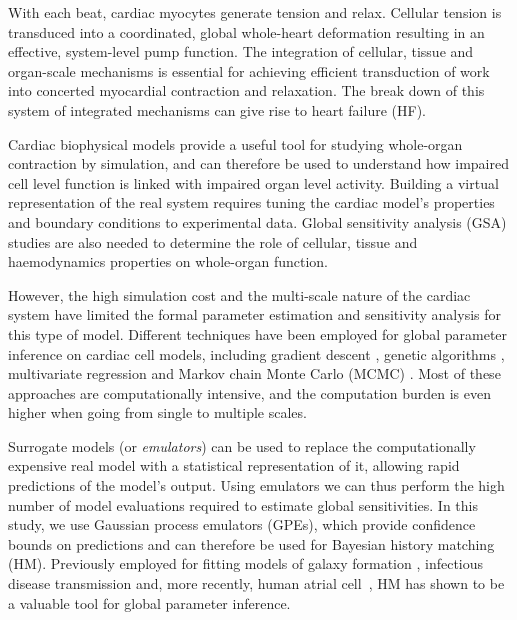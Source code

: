 
\noindent
With each beat, cardiac myocytes generate tension and relax. Cellular tension is transduced into a coordinated, global whole-heart deformation resulting in an effective, system-level pump function. The integration of cellular, tissue and organ-scale mechanisms is essential for achieving efficient transduction of work into concerted myocardial contraction and relaxation. The break down of this system of integrated mechanisms can give rise to heart failure (HF). 

Cardiac biophysical models provide a useful tool for studying whole-organ contraction \cite{Niederer:2019} by simulation, and can therefore be used to understand how impaired cell level function is linked with impaired organ level activity. Building a virtual representation of the real system requires tuning the cardiac model's properties and boundary conditions to experimental data. Global sensitivity analysis (GSA) studies are also needed to determine the role of cellular, tissue and haemodynamics properties on whole-organ function.

However, the high simulation cost and the multi-scale nature of the cardiac system have limited the formal parameter estimation and sensitivity analysis for this type of model. Different techniques have been employed for global parameter inference on cardiac cell models, including gradient descent \cite{Dokos:2004}, genetic algorithms \cite{Groenendaal:2015}, multivariate regression \cite{Sarkar:2010} and Markov chain Monte Carlo (MCMC) \cite{Johnstone:2016}. Most of these approaches are computationally intensive, and the computation burden is even higher when going from single to multiple scales.

Surrogate models (or \textit{emulators}) can be used to replace the computationally expensive real model with a statistical representation of it, allowing rapid predictions of the model's output. Using emulators we can thus perform the high number of model evaluations required to estimate global sensitivities. In this study, we use Gaussian process emulators (GPEs), which provide confidence bounds on predictions and can therefore be used for Bayesian history matching (HM). Previously employed for fitting models of galaxy formation \cite{Vernon:2010}, infectious disease transmission \cite{Andrianakis:2015} and, more recently, human atrial cell~\cite{Coveney:2018}, HM has shown to be a valuable tool for global parameter inference.

